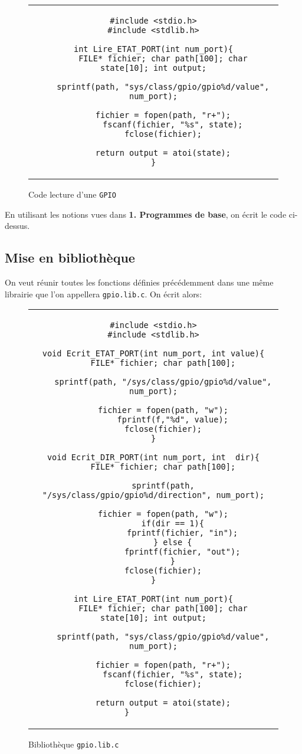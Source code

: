 \documentclass[11pt, openright]{book}
\begin{document}
\begin{figure}[ht!]
	\centering
	\begin{tabular}{c}
		\begin{lstlisting}
#include <stdio.h>
#include <stdlib.h>

int Lire_ETAT_PORT(int num_port){
    FILE* fichier; char path[100]; char state[10]; int output;

    sprintf(path, "sys/class/gpio/gpio%d/value", num_port);
    
    fichier = fopen(path, "r+");
        fscanf(fichier, "%s", state);
    fclose(fichier);

    return output = atoi(state);
}
				\end{lstlisting}
	\end{tabular}
	\caption{Code lecture d'une \texttt{GPIO} }
\end{figure}

En utilisant les notions vues dans \textbf{1. Programmes de base}, on écrit le code ci-dessus.
\newpage
\subsection{Mise en bibliothèque}

On veut réunir toutes les fonctions définies précédemment dans une même librairie que l'on appellera \texttt{gpio.lib.c}. On écrit alors:

\begin{figure}[ht!]
	\centering
	\begin{tabular}{c}
		\begin{lstlisting}
#include <stdio.h>
#include <stdlib.h>

void Ecrit_ETAT_PORT(int num_port, int value){
    FILE* fichier; char path[100];

    sprintf(path, "/sys/class/gpio/gpio%d/value", num_port);

    fichier = fopen(path, "w");
        fprintf(f,"%d", value);
    fclose(fichier);
}

void Ecrit_DIR_PORT(int num_port, int  dir){
    FILE* fichier; char path[100];

    sprintf(path, "/sys/class/gpio/gpio%d/direction", num_port);

    fichier = fopen(path, "w");
        if(dir == 1){
            fprintf(fichier, "in");
        } else {
            fprintf(fichier, "out");
        }
    fclose(fichier);
}

int Lire_ETAT_PORT(int num_port){
    FILE* fichier; char path[100]; char state[10]; int output;

    sprintf(path, "sys/class/gpio/gpio%d/value", num_port);
    
    fichier = fopen(path, "r+");
        fscanf(fichier, "%s", state);
    fclose(fichier);

    return output = atoi(state);
}			
				\end{lstlisting}
	\end{tabular}
	\caption{Bibliothèque \texttt{gpio.lib.c}}
\end{figure}
\newpage
\end{document}
